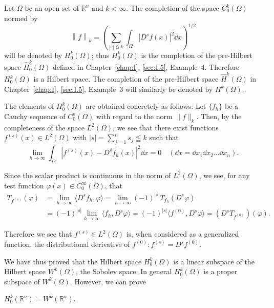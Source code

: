 \begin{examplen} Let $\Omega$ be an open set of $\mathbb{R}^{n}$ and $k < \infty$. The completion of the space $C_0^k(\Omega)$ normed by 
\[
\left\| f \right\|_{k} = \left(\sum\limits_{| s | \leqq k} \int_{\Omega} \left| D ^{s} f (x) \right| ^{2} \dd x\right) ^{1/2}
\]
will be denoted by $H_0^k(\Omega)$; thus $H_0^k(\Omega)$ is the completion of the pre-Hilbert space $\hat{H}_0^k(\Omega)$ defined in Chapter~\ref{chap:I}, \ref{sec:I.5}, Example~\hyperref[ex:I.5.Example.4]{$4$}. Therefore $H_0^k(\Omega)$ is a Hilbert space. The completion of the pre-Hilbert space $\hat{H}^k(\Omega)$ in Chapter~\ref{chap:I}, \ref{sec:I.5}, Example~\hyperref[ex:I.5.Example.3]{$3$} will similarly be denoted by $H^k(\Omega)$. 
\end{examplen}

The elements of $H_0^k(\Omega)$ are obtained concretely as follows: Let $\{f_h\}$ be a Cauchy sequence of $C_0^k(\Omega)$ with regard to the norm $\|f\|_k$. Then, by the completeness of the space $L^2(\Omega)$, we see that there exist functions $f^{(s)}(x) \in L^2(\Omega)$ with $|s| = \sum\limits_{j=1}^{n} s_j \leqq k$ such that 
\[
\lim\limits_{h \rightarrow \infty} \int_{\Omega} | f ^{(s)} (x)- D ^{s} f_{h} (x) | ^{2} \dd x = 0 \quad (\dd x = \dd x_{1} \dd x_{2} \dots \dd x_{n}).
\]

Since the scalar product is continuous in the norm of $L^2(\Omega)$, we see, for any test function $\varphi(x) \in C_0^\infty(\Omega)$, that 
\[
\begin{aligned} T_ {f ^{(s)}} (\varphi) & = \lim\limits_{h \to \infty} \langle D ^{s} f_{h}, \varphi \rangle = \lim\limits_{h \to \infty} (- 1) ^{|s|} T_ {f_{h}} (D ^{s} \varphi) \\ & = (- 1) ^{|s|} \lim\limits_{h \to \infty} \langle f_{h}, D ^{s} \varphi \rangle = (- 1) ^{|s|} \langle f ^{(0)}, D ^{s} \varphi \rangle = (D ^{s} T_ {f ^{(0)}}) (\varphi). \end{aligned}
\]

Therefore we see that $f^{(s)} \in L^2(\Omega)$ is, when considered as a generalized function, the distributional derivative of $f^{(0)}: f^{(s)} = D^s f^{(0)}$. 

We have thus proved that the Hilbert space $H_{0}^{k}(\Omega)$ is a linear subspace of the Hilbert space $W^{k}(\Omega)$, the Sobolev space. In general $H_{0}^{k}(\Omega)$ is a proper subspace of $W^{k}(\Omega)$. However, we can prove 

\begin{propositionu} $H_0^k (\mathbb{R}^{n}) = W^k (\mathbb{R}^{n})$. 
\end{propositionu}

